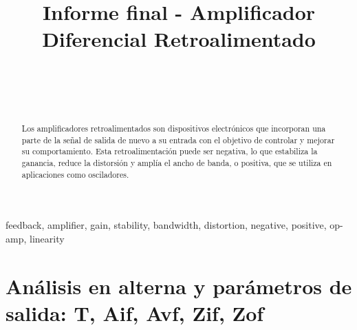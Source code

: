 \documentclass[conference]{IEEEtran}
\begin{document}
	
	\title{Informe final - Amplificador Diferencial Retroalimentado}
	\author{
        \\
        \\
		\\
        \and
        \and
        \and
	}
    
	\maketitle
    \begin{abstract}
		Los amplificadores retroalimentados son dispositivos electrónicos que incorporan una parte de la señal de salida de nuevo a su entrada con el objetivo de controlar y mejorar su comportamiento. Esta retroalimentación puede ser negativa, lo que estabiliza la ganancia, reduce la distorsión y amplía el ancho de banda, o positiva, que se utiliza en aplicaciones como osciladores.
	\end{abstract}
    \begin{IEEEkeywords}
		feedback, amplifier, gain, stability, bandwidth, distortion, negative, positive, op-amp, linearity
	\end{IEEEkeywords}

    \section{Análisis en alterna y parámetros de salida: T, Aif, Avf, Zif, Zof}
\end{document}
